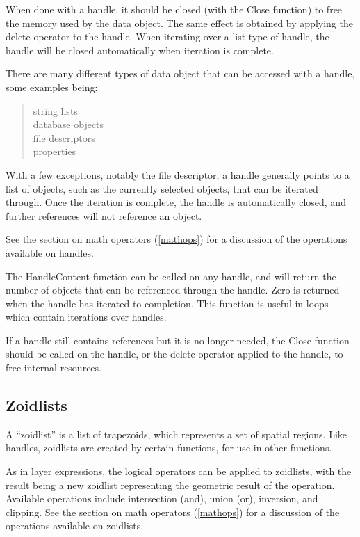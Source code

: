 When done with a handle, it should be closed (with the {\vt Close}
function) to free the memory used by the data object.  The same effect
is obtained by applying the {\vt delete} operator to the handle.  When
iterating over a list-type of handle, the handle will be closed
automatically when iteration is complete.

There are many different types of data object that can be accessed
with a handle, some examples being:
\begin{quote}
    string lists\\
    database objects\\
    file descriptors\\
    properties
\end{quote}
With a few exceptions, notably the file descriptor, a handle generally
points to a list of objects, such as the currently selected objects,
that can be iterated through.  Once the iteration is complete, the
handle is automatically closed, and further references will not reference an
object.

See the section on math operators (\ref{mathops}) for a discussion of
the operations available on handles.

The {\vt HandleContent} function can be called on any handle, and will
return the number of objects that can be referenced through the
handle.  Zero is returned when the handle has iterated to completion. 
This function is useful in loops which contain iterations over
handles.

If a handle still contains references but it is no longer needed, the
{\vt Close} function should be called on the handle, or the {\vt
delete} operator applied to the handle, to free internal resources.

\subsection{Zoidlists}

A ``zoidlist'' is a list of trapezoids, which represents a set of
spatial regions.  Like handles, zoidlists are created by certain
functions, for use in other functions.

As in layer expressions, the logical operators can be applied to
zoidlists, with the result being a new zoidlist representing the
geometric result of the operation.  Available operations include
intersection (and), union (or), inversion, and clipping.  See the
section on math operators (\ref{mathops}) for a discussion of the
operations available on zoidlists.

